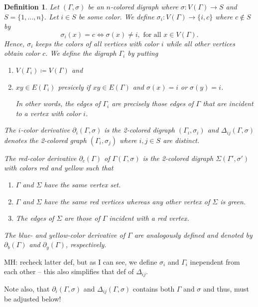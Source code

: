 \documentclass[final,3p,times]{elsarticle}
\newtheorem{definition}{Definition}[section]
\newcommand{\TODO}[1]{\begingroup\color{red}#1\endgroup}
\newcommand{\OLD}[1]{\begingroup\tiny\color{gray}#1\endgroup}
\newcommand{\mh}[1]{\begingroup\color{magenta}#1\endgroup}
\begin{document}
\begin{definition}
\label{def:color-derivative}
\mh{Let $(\Gamma,\sigma)$ be an $n$-colored digraph where $\sigma\colon V(\Gamma) \to S$ 
and $S = \{1,\dots,n\}$. Let $i\in S$ be some color. We define
$\sigma_i\colon V(\Gamma) \to \{i,c\}$ where $c\notin S$
by \[\sigma_i(x)=c \iff \sigma(x)\neq i, \text{ for all } x\in V(\Gamma).\]
Hence, $\sigma_i$ keeps the colors of all vertices with color $i$ while
all other vertices obtain color $c$. 
We define the digraph $\Gamma_i$ by putting
\begin{enumerate}
    \item $V(\Gamma_i) \coloneqq V(\Gamma)$ and
    
    \item $xy\in E(\Gamma_i)$  presicely if $xy\in E(\Gamma)$ and 
    	  $\sigma(x)=i	$ or  $\sigma(y)=i$.
    	  
    	  In other words, the edges of $\Gamma_i$ are precisely those edges 
    	  of $\Gamma$ that are incident to a vertex with color $i$.
\end{enumerate}

The \emph{$i$-color derivative} $\partial_i(\Gamma,\sigma)$ is the 2-colored
digraph $(\Gamma_i,\sigma_i)$ and $\Delta_{ij}(\Gamma,\sigma)$ denotes the
2-colored graph $(\Gamma_i,\sigma_j)$ where $i,j\in S$ are distinct. 
}






\OLD{
The \emph{red-color derivative} $\partial_c(\Gamma)$ of
\OLD{$\Gamma$}\mh{$(\Gamma,\sigma)$} is the 2-colored digraph
\OLD{$\Sigma$}\mh{$(\Gamma',\sigma')$} with colors red and yellow such that
\begin{enumerate}
    \item $\Gamma$ and $\Sigma$ have the same vertex set. 
    \item $\Gamma$ and $\Sigma$ have the same red vertices whereas any other vertex of $\Sigma$ is green. 
    \item The edges of $\Sigma$ are those of $\Gamma$ incident with a red vertex. 
\end{enumerate}
The blue- and yellow-color derivative of $\Gamma$ are analogously defined and
denoted by $\partial_b(\Gamma)$ and $\partial_y(\Gamma)$, respectively. }
\end{definition} 
 


\TODO{MH: recheck latter def, but as I can see, we define $\sigma_i$ and $\Gamma_i$
inependent from each other -- this also simplifies that def of $\Delta_{ij}$. 

Note also, that $\partial_i(\Gamma,\sigma)$ and $\Delta_{ij}(\Gamma,\sigma)$
contains both $\Gamma$ and $\sigma$ and thus, must be adjusted below!
}
\end{document}
